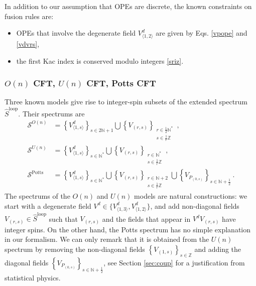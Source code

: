 \documentclass[12pt, a4paper]{article}
\theoremstyle{break}
\begin{document}
In addition to our assumption that OPEs are discrete, the known constraints on fusion rules are:
\begin{itemize}
\item OPEs that involve the degenerate field $V^d_{\langle 1,2\rangle}$ are given by Eqs. \eqref{vpope} and \eqref{vdvrs}, 
 \item the first Kac index is conserved modulo integers \eqref{sriz}.
\end{itemize}

\subsubsection{$O(n)$ CFT, $U(n)$ CFT, Potts CFT}\label{sec:models}

Three known models give rise to integer-spin subsets of the extended spectrum $\widehat{S}^\text{loop}$. 
Their spectrums are 
\begin{align}
\mathcal{S}^{O(n)} &= \left\{V^d_{\langle 1,s\rangle}\right\}_{s\in 2\mathbb{N}+1} \bigcup \left\{V_{(r,s)}\right\}_{\substack{r\in \frac12\mathbb{N}^*\\ s\in\frac{1}{r}\mathbb{Z}}}  \ ,
\label{son}
 \\
 \mathcal{S}^{U(n)} &= \left\{V^d_{\langle 1,s\rangle}\right\}_{s\in\mathbb{N}^*} \bigcup \left\{V_{(r,s)}\right\}_{\substack{r\in \mathbb{N}^*\\ s\in\frac{1}{r}\mathbb{Z}}}  \ ,
 \label{sun}
 \\
 \mathcal{S}^\text{Potts} &= \left\{V^d_{\langle 1,s\rangle}\right\}_{s\in\mathbb{N}^*} \bigcup \left\{V_{(r,s)}\right\}_{\substack{r\in \mathbb{N}+2\\ s\in\frac{1}{r}\mathbb{Z}}} \bigcup  \left\{ V_{P_{(0,s)}}\right\}_{s\in \mathbb{N}+\frac12}\ .
 \label{spotts}
\end{align}
The spectrums of the $O(n)$ and $U(n)$ models are natural constructions: we start with a degenerate field $V^d\in\{V^d_{\langle 1,3\rangle},V^d_{\langle 1,2\rangle}\}$, and add non-diagonal fields $V_{(r,s)}\in\widehat{S}^\text{loop}$ such that $V_{(r,s)}$ and the fields that appear in $V^dV_{(r,s)}$ have integer spins. 
On the other hand, the Potts spectrum has no simple explanation in our formalism. We can only remark that it is obtained from the $U(n)$ spectrum by removing the non-diagonal fields $\left\{V_{(1,s)}\right\}_{s\in\mathbb{Z}}$ and adding the diagonal fields $\left\{ V_{P_{(0,s)}}\right\}_{s\in \mathbb{N}+\frac12}$, see Section \ref{sec:coup} for a justification from statistical physics.  
\end{document}
